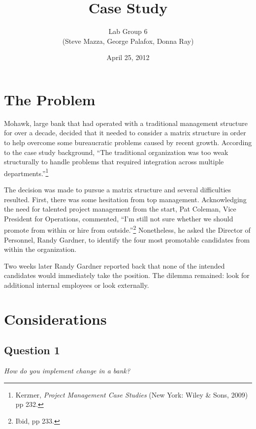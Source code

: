\documentclass[letterpaper,10pt]{article}
\title{Case Study}
\author{Lab Group 6 \\ { \small (Steve Mazza, George Palafox, Donna Ray)}}
\date{April 25, 2012}
\begin{document}
\maketitle

\section{The Problem}
Mohawk, large bank that had operated with a traditional management structure for over a decade, decided that it needed to consider a matrix structure in order to help overcome some bureaucratic problems caused by recent growth.  According to the case study background, ``The traditional organization was too weak structurally to handle problems that required integration across multiple departments.''\footnote{Kerzner, \emph{Project Management Case Studies} (New York: Wiley \& Sons, 2009) pp 232.}

The decision was made to pursue a matrix structure and several difficulties resulted.  First, there was some hesitation from top management.  Acknowledging the need for talented project management from the start, Pat Coleman, Vice President for Operations, commented, ``I'm still not sure whether we should promote from within or hire from outside.''\footnote{Ibid, pp 233.}  Nonetheless, he asked the Director of Personnel, Randy Gardner, to identify the four most promotable candidates from within the organization.

Two weeks later Randy Gardner reported back that none of the intended candidates would immediately take the position.  The dilemma remained: look for additional internal employees or look externally.

\section{Considerations}
\subsection{Question 1}
\emph{How do you implement change in a bank?}\vspace*{1em}\vspace*{1em}
\end{document}
